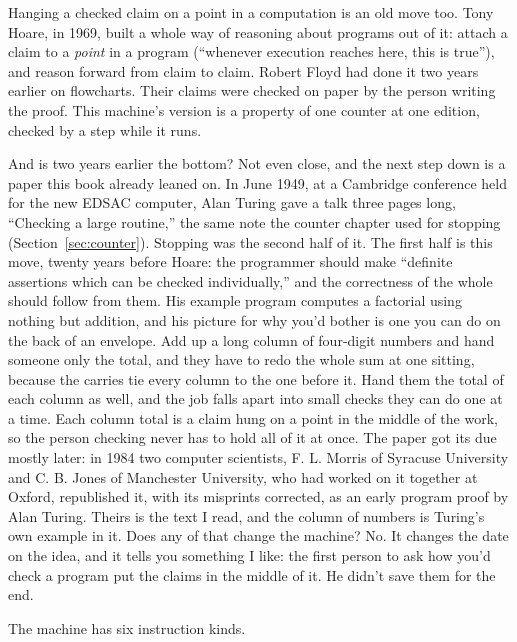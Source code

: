 \documentclass[11pt,twoside]{article}
\theoremstyle{thielethm}
\theoremstyle{thieledef}
\theoremstyle{thieledef}
\theoremstyle{thieledef}
\theoremstyle{thielethm}
\theoremstyle{thieleobs}
\theoremstyle{thielethm}
\begin{document}
Hanging a checked claim on a point in a computation is an old move too. Tony Hoare, in 1969,
built a whole way of reasoning about programs out of it: attach a claim to a \emph{point} in a
program (``whenever execution reaches here, this is true''), and reason forward from claim to
claim. Robert Floyd had done it two years earlier on flowcharts. Their claims were checked on
paper by the person writing the proof. This machine's version is a property of one counter at
one edition, checked by a step while it runs.

And is two years earlier the bottom? Not even close, and the next step down is a paper this
book already leaned on. In June 1949, at a Cambridge conference held for the new EDSAC
computer, Alan Turing gave a talk three pages long, ``Checking a large routine,'' the same note
the counter chapter used for stopping (Section~\ref{sec:counter}). Stopping was the second half
of it. The first half is this move, twenty years before Hoare: the programmer should make
``definite assertions which can be checked individually,'' and the correctness of the whole
should follow from them. His example program computes a factorial using nothing but addition,
and his picture for why you'd bother is one you can do on the back of an envelope. Add up a long
column of four-digit numbers and hand someone only the total, and they have to redo the whole
sum at one sitting, because the carries tie every column to the one before it. Hand them the
total of each column as well, and the job falls apart into small checks they can do one at a
time. Each column total is a claim hung on a point in the middle of the work, so the person checking never
has to hold all of it at once. The paper got its due mostly later: in 1984 two computer scientists, F. L. Morris of Syracuse
University and C. B. Jones of Manchester University, who had worked on it together at Oxford,
republished it, with its misprints corrected, as an early program proof by Alan
Turing. Theirs is the text I read, and the column of numbers is Turing's own example in it. Does any of that change the machine? No. It changes the date on the idea, and it tells
you something I like: the first person to ask how you'd check a program put the claims in the
middle of it. He didn't save them for the end.

The machine has six instruction kinds.
\end{document}
